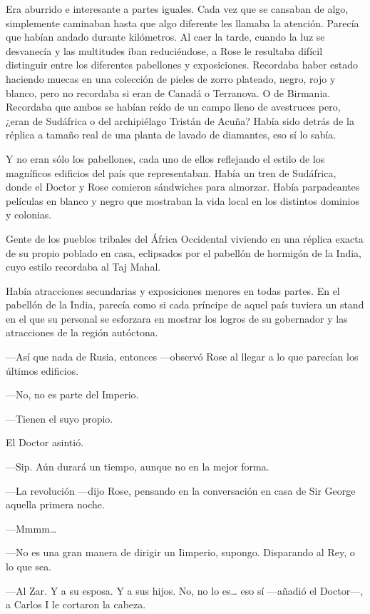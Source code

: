 {Era aburrido e interesante a partes iguales. Cada vez que se cansaban
	de algo, simplemente caminaban hasta que algo diferente les llamaba la
	atención. Parecía que habían andado durante kilómetros. Al caer la
	tarde, cuando la luz se desvanecía y las multitudes iban reduciéndose, a
	Rose le resultaba difícil distinguir entre los diferentes pabellones y
	exposiciones. Recordaba haber estado haciendo muecas en una colección de
	pieles de zorro plateado, negro, rojo y blanco, pero no recordaba si
	eran de Canadá o Terranova. O de Birmania. Recordaba que ambos se habían
	reído de un campo lleno de avestruces pero, ¿eran de Sudáfrica o del
	archipiélago Tristán de Acuña? Había sido detrás de la réplica a tamaño
real de una planta de lavado de diamantes, eso sí lo sabía.}

{Y no eran sólo los pabellones, cada uno de ellos reflejando el estilo
	de los magníficos edificios del país que representaban. Había un tren de
	Sudáfrica, donde el Doctor y Rose comieron sándwiches para almorzar.
	Había parpadeantes películas en blanco y negro que mostraban la vida
local en los distintos dominios y colonias.}

{Gente de los pueblos tribales del África Occidental viviendo en una
	réplica exacta de su propio poblado en casa, eclipsados por el pabellón
de hormigón de la India, cuyo estilo recordaba al Taj Mahal.}

{Había atracciones secundarias y exposiciones menores en todas partes.
	En el pabellón de la India, parecía como si cada príncipe de aquel país
	tuviera un stand en el que su personal se esforzara en mostrar los
logros de su gobernador y las atracciones de la región autóctona.}

{---Así que nada de Rusia, entonces ---observó Rose al llegar a lo que
parecían los últimos edificios.}

{---No, no es parte del Imperio.}

{---Tienen el suyo propio.}

{El Doctor asintió.}

{---Sip. Aún durará un tiempo, aunque no en la mejor forma.}

{---La revolución ---dijo Rose, pensando en la conversación en casa de
Sir George aquella primera noche.}

{---Mmmm\ldots{}}

{---No es una gran manera de dirigir un Iimperio, supongo. Disparando al
Rey, o lo que sea.}

{---Al Zar. Y a su esposa. Y a sus hijos. No, no lo es\ldots{} eso sí
---añadió el Doctor---, a Carlos I le cortaron la cabeza.}


